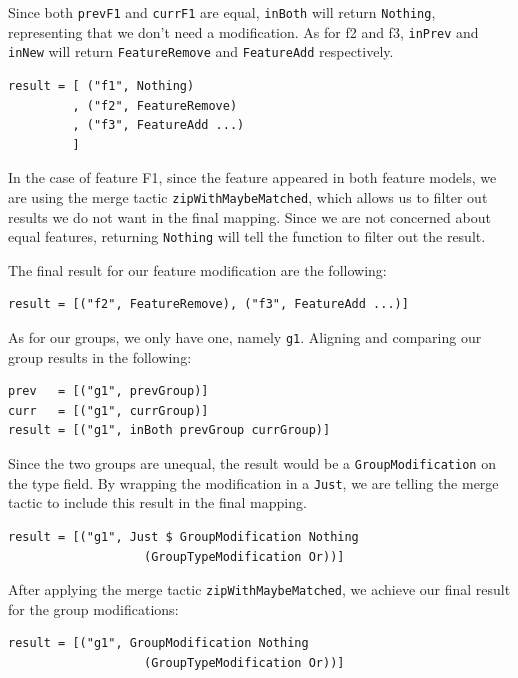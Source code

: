 \documentclass[a4paper,english]{ifimaster}
\begin{document}
Since both \texttt{prevF1} and \texttt{currF1} are equal, \texttt{inBoth} will return \texttt{Nothing}, representing that we don't need a modification. As for f2 and f3, \texttt{inPrev} and \texttt{inNew} will return \texttt{FeatureRemove} and \texttt{FeatureAdd} respectively.

\begin{verbatim}
result = [ ("f1", Nothing)
         , ("f2", FeatureRemove)
         , ("f3", FeatureAdd ...)
         ]
\end{verbatim}

In the case of feature F1, since the feature appeared in both feature models, we are using the merge tactic \texttt{zip\-With\-Maybe\-Matched}, which allows us to filter out results we do not want in the final mapping. Since we are not concerned about equal features, returning \texttt{Nothing} will tell the function to filter out the result.

The final result for our feature modification are the following:

\begin{verbatim}
result = [("f2", FeatureRemove), ("f3", FeatureAdd ...)]
\end{verbatim}

As for our groups, we only have one, namely \texttt{g1}. Aligning and comparing our group results in the following:

\begin{verbatim}
prev   = [("g1", prevGroup)]
curr   = [("g1", currGroup)]
result = [("g1", inBoth prevGroup currGroup)]
\end{verbatim}

Since the two groups are unequal, the result would be a \texttt{GroupModification} on the type field. By wrapping the modification in a \texttt{Just}, we are telling the merge tactic to include this result in the final mapping.

\begin{verbatim}
result = [("g1", Just $ GroupModification Nothing 
                   (GroupTypeModification Or))]
\end{verbatim}

After applying the merge tactic \texttt{zip\-With\-Maybe\-Matched}, we achieve our final result for the group modifications:

\begin{verbatim}
result = [("g1", GroupModification Nothing 
                   (GroupTypeModification Or))]
\end{verbatim}
\end{document}
